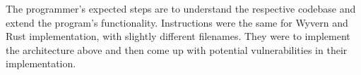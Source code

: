 The programmer's expected steps are to understand the respective codebase and extend the program's functionality. Instructions were the same for Wyvern and Rust implementation, with slightly different filenames. They were to implement the architecture above and then come up with potential vulnerabilities in their implementation.